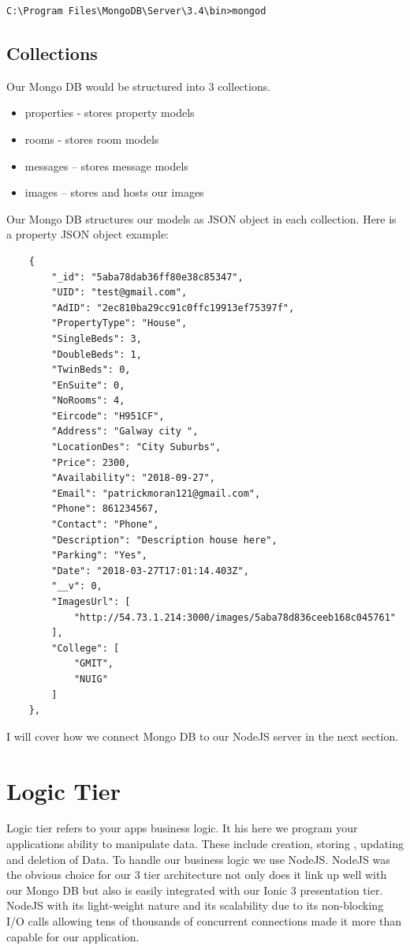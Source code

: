 \begin{verbatim}
C:\Program Files\MongoDB\Server\3.4\bin>mongod
\end{verbatim}

\subsection{Collections}

Our Mongo DB would be structured into 3 collections.
\begin{itemize}
    \item properties - stores property models 
    \item rooms - stores room models
    \item messages – stores message models 
    \item images – stores and hosts our images
\end{itemize}


Our Mongo DB structures our models as JSON object in each collection. Here is a property JSON object example:

\begin{verbatim}
    {
        "_id": "5aba78dab36ff80e38c85347",
        "UID": "test@gmail.com",
        "AdID": "2ec810ba29cc91c0ffc19913ef75397f",
        "PropertyType": "House",
        "SingleBeds": 3,
        "DoubleBeds": 1,
        "TwinBeds": 0,
        "EnSuite": 0,
        "NoRooms": 4,
        "Eircode": "H951CF",
        "Address": "Galway city ",
        "LocationDes": "City Suburbs",
        "Price": 2300,
        "Availability": "2018-09-27",
        "Email": "patrickmoran121@gmail.com",
        "Phone": 861234567,
        "Contact": "Phone",
        "Description": "Description house here",
        "Parking": "Yes",
        "Date": "2018-03-27T17:01:14.403Z",
        "__v": 0,
        "ImagesUrl": [
            "http://54.73.1.214:3000/images/5aba78d836ceeb168c045761"
        ],
        "College": [
            "GMIT",
            "NUIG"
        ]
    },
\end{verbatim}

I will cover how we connect Mongo DB to our NodeJS server in the next section.

\section{Logic Tier}

Logic tier refers to your apps business logic. It his here we program your applications ability to manipulate data. These include creation, storing , updating and deletion of Data. To handle our business logic we use NodeJS. NodeJS was the obvious choice for our 3 tier architecture not only does it link up well with our Mongo DB  but also is easily integrated with our Ionic 3 presentation tier. NodeJS with its light-weight nature and its scalability due to its non-blocking I/O calls allowing tens of thousands of concurrent connections made it more than capable for our application.

